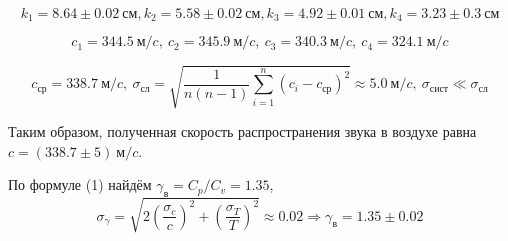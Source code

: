 \documentclass[12pt,a4paper]{article}
\begin{document}
\begin{enumerate}
\begin{equation*}
    k_1 = 8.64\pm 0.02\ см, 
    k_2 = 5.58\pm 0.02\ см,
    k_3 = 4.92\pm 0.01\ см,
    k_4 = 3.23\pm 0.3\ см
\end{equation*}

\begin{equation*}
    c_1 = 344.5\ м/c,\ 
    c_2 = 345.9\ м/c,\ 
    c_3 = 340.3\ м/c,\ 
    c_4 = 324.1\ м/c
\end{equation*}

\begin{equation*}
    c_{ср} = 338.7\ м/c,\ \sigma_{сл}=\sqrt{\frac{1}{n(n-1)}\sum^n_{i=1}(c_i-c_{ср})^2}
\approx 5.0\ м/c,\ \sigma_{сист} \ll \sigma_{сл}
\end{equation*}

Таким образом, полученная скорость распространения звука в воздухе равна $c=(338.7 \pm 5)\ м/c$.

По формуле (1) найдём $\gamma_{в}=C_p/C_v=1.35$,
\begin{equation*}
    \sigma_\gamma=\sqrt{2\left(\frac{\sigma_c}{c}\right)^2+\left(\frac{\sigma_T}{T}\right)^2}\approx 0.02 \Rightarrow \gamma_{в}=1.35\pm0.02
\end{equation*}
\end{enumerate}
\end{document}
